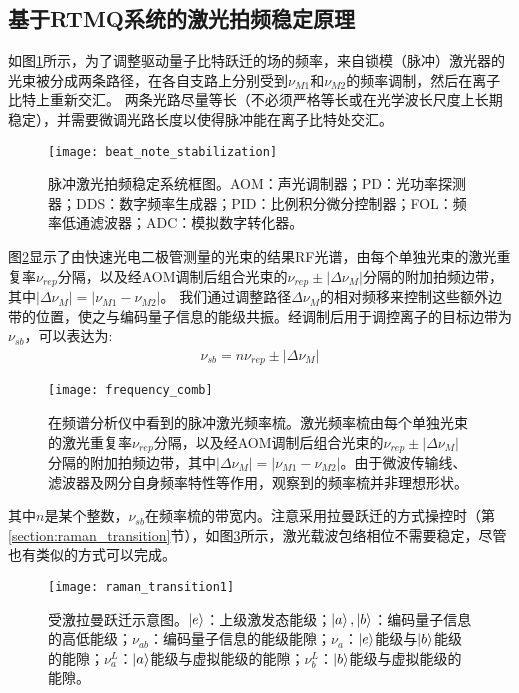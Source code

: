 \subsection[基于RTMQ系统的激光拍频稳定原理]{基于RTMQ系统的激光拍频稳定原理}

如图\ref{fig:beat_note_stabilization}所示，为了调整驱动量子比特跃迁的场的频率，来自锁模（脉冲）激光器的光束被分成两条路径，在各自支路上分别受到$\nu_{M1}$和$\nu_{M2}$的频率调制，然后在离子比特上重新交汇。
两条光路尽量等长（不必须严格等长或在光学波长尺度上长期稳定），并需要微调光路长度以使得脉冲能在离子比特处交汇。

\begin{figure}
    \centering
    \caption[脉冲激光拍频稳定系统框图]{脉冲激光拍频稳定系统框图。AOM：声光调制器；PD：光功率探测器；DDS：数字频率生成器；PID：比例积分微分控制器；FOL：频率低通滤波器；ADC：模拟数字转化器。\label{fig:beat_note_stabilization}}
    \texttt{[image: beat\_note\_stabilization]}
\end{figure}

图\ref{fig:frequency_comb}显示了由快速光电二极管测量的光束的结果RF光谱，由每个单独光束的激光重复率$\nu_{rep}$分隔，以及经AOM调制后组合光束的$\nu_{rep}\pm |\Delta \nu_M|$分隔的附加拍频边带，其中$|\Delta \nu_M|=|\nu_{M1}-\nu_{M2}|$。
我们通过调整路径$\Delta\nu_M$的相对频移来控制这些额外边带的位置，使之与编码量子信息的能级共振。经调制后用于调控离子的目标边带为$\nu_{sb}$，可以表达为:
\begin{align}
    \nu_{sb}=n\nu_{rep}\pm|\Delta\nu_M|
\end{align}

\begin{figure}
    \centering
    \caption[脉冲激光频率梳]{在频谱分析仪中看到的脉冲激光频率梳。激光频率梳由每个单独光束的激光重复率$\nu_{rep}$分隔，以及经AOM调制后组合光束的$\nu_{rep}\pm |\Delta \nu_M|$分隔的附加拍频边带，其中$|\Delta \nu_M|=|\nu_{M1}-\nu_{M2}|$。由于微波传输线、滤波器及网分自身频率特性等作用，观察到的频率梳并非理想形状。\label{fig:frequency_comb}}
    \texttt{[image: frequency\_comb]}
\end{figure}

其中$n$是某个整数，$\nu_{sb}$在频率梳的带宽内。注意采用拉曼跃迁的方式操控时（第\ref{section:raman_transition}节），如图\ref{fig:raman_transition1}所示，激光载波包络相位不需要稳定\cite[]{Peer_Shapiro_Stowe_Shapiro_Ye_2007}，尽管也有类似的方式可以完成\cite[]{Koke_Grebing_Frei_Anderson_Assion_Steinmeyer_2010}。

\begin{figure}
    \centering
    \caption[受激拉曼跃迁示意图]{受激拉曼跃迁示意图。$\ket{e}$：上级激发态能级；$\ket{a},\ket{b}$：编码量子信息的高低能级；$\nu_{ab}$：编码量子信息的能级能隙；$\nu_{a}$：$\ket{e}$能级与$\ket{b}$能级的能隙；$\nu_a^L$：$\ket{a}$能级与虚拟能级的能隙；$\nu_b^L$：$\ket{b}$能级与虚拟能级的能隙。\label{fig:raman_transition1}}
    \texttt{[image: raman\_transition1]}
\end{figure}

